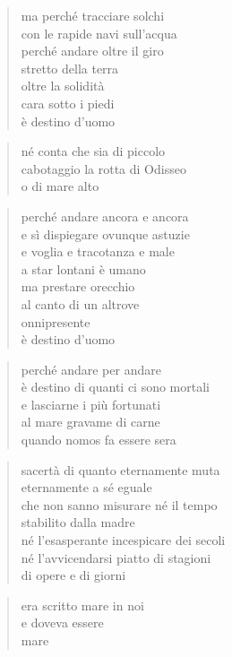 	\begin{verse}
		ma perché tracciare solchi\\
		con le rapide navi sull’acqua\\
		perché andare oltre il giro\\
		stretto della terra\\
		oltre la solidità\\
		cara sotto i piedi\\
		è destino d’uomo
	\end{verse}

	\begin{verse}
		né conta che sia di piccolo\\
		cabotaggio la rotta di Odisseo\\
		o di mare alto
	\end{verse}

	\begin{verse}
		perché andare ancora e ancora\\
		e sì dispiegare ovunque astuzie\\
		e voglia e tracotanza e male\\
		a star lontani è umano\\
		ma prestare orecchio\\
		al canto di un altrove\\
		onnipresente\\
		è destino d’uomo
	\end{verse}

	\begin{verse}
		perché andare per andare\\
		è destino di quanti ci sono mortali\\
		e lasciarne i più fortunati\\
		al mare gravame di carne\\
		quando nomos fa essere sera
	\end{verse}

	\begin{verse}
		sacertà di quanto eternamente muta\\
		eternamente a sé eguale\\
		che non sanno misurare né il tempo\\
		stabilito dalla madre\\
		né l’esasperante incespicare dei secoli\\
		né l’avvicendarsi piatto di stagioni\\
		di opere e di giorni
	\end{verse}

	\begin{verse}
		era scritto mare in noi\\
		e doveva essere\\
		mare
	\end{verse}
